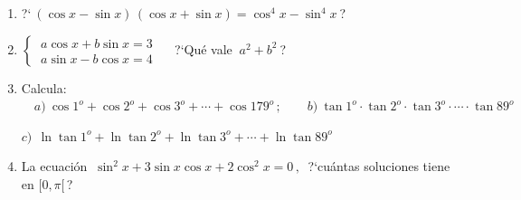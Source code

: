 \begin{enumerate}
\item ?`$\ (\cos x -\sin x)\, (\cos x+\sin x) = \cos^4 x - \sin^4 x\ $? 

\vspace{-6mm}
\begin{flushright}
\begin{footnotesize} \textcolor{gris}{}	\end{footnotesize}
\end{flushright}


\item $\begin{cases} \ a\cos x+b\sin x= 3 \\ \ a\sin x-b\cos x=4 \end{cases} \quad$ ?`Qué vale $\ a^2+b^2 \ $?

\vspace{-6mm}
\begin{flushright}
\begin{footnotesize} \textcolor{gris}{}	\end{footnotesize}
\end{flushright}


\item	Calcula: $\quad a)\ \cos 1^o+\cos 2^o+\cos 3^o+ \cdots + \cos 179^o \, ; \qquad b) \ \tan 1^o \cdot \tan 2^o \cdot \tan 3^o \cdot \cdots \cdot \tan 89^o$

$c)\ \ \ln \tan 1^o +\ln  \tan 2^o +\ln \tan 3^o + \cdots +\ln \tan 89^o$

\vspace{-6mm}
\begin{flushright}
\begin{footnotesize} \textcolor{gris}{}	\end{footnotesize}
\end{flushright}


\item	La ecuación $\ \sin^2 x+3\sin x \cos x+2\cos^2 x=0\, , \ $ ?`cuántas soluciones tiene en $[0,\pi[\, $?

\vspace{-6mm}
\begin{flushright}
\begin{footnotesize} \textcolor{gris}{}	\end{footnotesize}
\end{flushright}


\end{enumerate}
